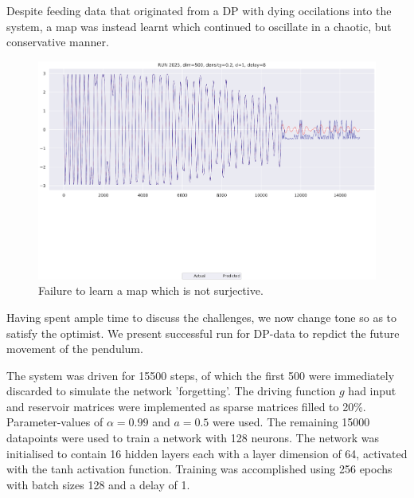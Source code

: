 \documentclass[a4paper,12pt,twoside]{report}
\begin{document}
Despite feeding data that originated from a DP with dying occilations into the system, a map was instead learnt which continued to oscillate in a chaotic, but conservative manner.

\begin{figure}[ht]
  \includegraphics[scale=0.4]{_dpfailure_nonsurj.eps}
  \centering
\caption{Failure to learn a map which is not surjective.}
\label{fig:dp_notsurjective}
\end{figure}



Having spent ample time to discuss the challenges, we now change tone so as to satisfy the optimist.
We present successful run for DP-data to repdict the future movement of the pendulum.

The system was driven for 15500 steps, of which the first 500 were immediately discarded to simulate the network 'forgetting'. The driving function $g$ had input and reservoir matrices were implemented as sparse matrices filled to 20\%. Parameter-values of $\alpha=0.99$ and $a=0.5$ were used.
The remaining 15000 datapoints were used to train a network with 128 neurons. 
The network was initialised to contain 16 hidden layers each with a layer dimension of 64, activated with the tanh activation function.
Training was accomplished using 256 epochs with batch sizes 128 and a delay of 1. 

\end{document}
